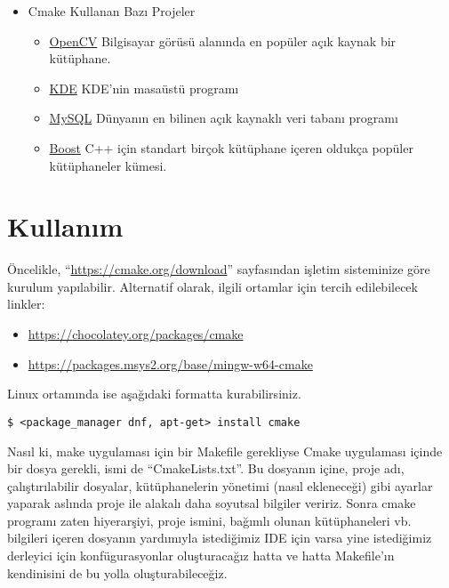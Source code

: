 \documentclass[
]{book}
\providecommand{\tightlist}{%
  \setlength{\itemsep}{0pt}\setlength{\parskip}{0pt}}
\begin{document}
\begin{itemize}
\tightlist
\item
  Cmake Kullanan Bazı Projeler

  \begin{itemize}
  \tightlist
  \item
    \href{https://github.com/emacs-mirror/emacs}{OpenCV}
    Bilgisayar görüsü alanında en popüler açık kaynak bir kütüphane.
  \item
    \href{https://github.com/KDE/plasma-desktop}{KDE}
    KDE'nin masaüstü programı
  \item
    \href{https://github.com/gcc-mirror/gcc}{MySQL}
    Dünyanın en bilinen açık kaynaklı veri tabanı programı
  \item
    \href{https://github.com/gcc-mirror/gcc}{Boost}
    C++ için standart birçok kütüphane içeren oldukça popüler kütüphaneler kümesi.
  \end{itemize}
\end{itemize}

\hypertarget{kullanux131m-1}{%
\section*{Kullanım}\label{kullanux131m-1}}

Öncelikle, ``\url{https://cmake.org/download}'' sayfasından işletim sisteminize göre kurulum yapılabilir. Alternatif olarak, ilgili ortamlar için tercih edilebilecek linkler:

\begin{itemize}
\tightlist
\item
  \url{https://chocolatey.org/packages/cmake}
\item
  \url{https://packages.msys2.org/base/mingw-w64-cmake}
\end{itemize}

Linux ortamında ise aşağıdaki formatta kurabilirsiniz.

\texttt{\$\ \textless{}package\_manager\ dnf,\ apt-get\textgreater{}\ install\ cmake}

Nasıl ki, make uygulaması için bir Makefile gerekliyse Cmake uygulaması içinde bir dosya gerekli, ismi de ``CmakeLists.txt''. Bu dosyanın içine, proje adı, çalıştırılabilir dosyalar, kütüphanelerin yönetimi (nasıl ekleneceği) gibi ayarlar yaparak aslında proje ile alakalı daha soyutsal bilgiler veririz. Sonra cmake programı zaten hiyerarşiyi, proje ismini, bağımlı olunan kütüphaneleri vb. bilgileri içeren dosyanın yardımıyla istediğimiz IDE için varsa yine istediğimiz derleyici için konfügurasyonlar oluşturacağız hatta ve hatta Makefile'ın kendinisini de bu yolla oluşturabileceğiz.
\end{document}
